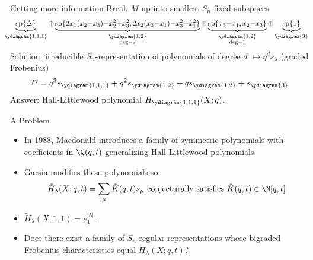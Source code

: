 \documentclass[dvipsnames]{beamer}
\renewcommand{\Span}{\operatorname{sp}}
\theoremstyle{definition}
\begin{document}
\begin{frame}{Getting more information}
  \pause
  Break \(M\) up into smallest \(S_n\) fixed subspaces 
  \[
    \hspace{-0.75em}
    \scalebox{0.95}{\(
      \underbrace{\Span\{\Delta\}}_{\ydiagram{1,1,1}} {\oplus} \underbrace{\Span\{2x_1(x_2{-}x_3){-}x_2^2{+}x_3^2,
        2x_2(x_3{-}x_1){-}x_3^2{+}x_1^2\}}_{\substack{\ydiagram{1,2}\\\deg
        = 2}} {\oplus}
      \underbrace{\Span\{x_3{-}x_1, x_2{-}x_3\}}_{\substack{\ydiagram{1,2}\\\deg=1}} {\oplus} \underbrace{\Span\{1\}}_{\ydiagram{3}}\)}
  \]
  \pause
  Solution: irreducible \(S_n\)-representation of polynomials of degree \(d\) \(\mapsto q^d
  s_\lambda\) (graded Frobenius)\[
    ?? = q^3 s_{\ydiagram{1,1,1}} + q^2 s_{\ydiagram{1,2}} + q
    s_{\ydiagram{1,2}} + s_{\ydiagram{3}}
  \]\pause
  Answer: Hall-Littlewood polynomial \(H_{\ydiagram{1,1,1}}(X;q)\).
\end{frame}
\begin{frame}{A Problem}
  \begin{itemize}
  \item In 1988, Macdonald introduces a family of symmetric
    polynomials with coefficients in \(\Q(q,t)\) generalizing
    Hall-Littlewood polynomials.\pause
  \item Garsia modifies these polynomials so 
    \[
      \tilde{H}_\lambda(X;q,t) = \sum_\mu \tilde{K}(q,t) s_\mu \text{
        conjecturally satisfies }\tilde{K}(q,t) \in \N[q,t]
    \]\pause
  \item \(\tilde{H}_\lambda(X;1,1) = e_1^{|\lambda|}\).\pause
  \item Does there
    exist a family of \(S_n\)-regular representations whose bigraded
    Frobenius characteristics equal \(\tilde{H}_\lambda(X;q,t)\)?
  \end{itemize}
\end{frame}
\end{document}
